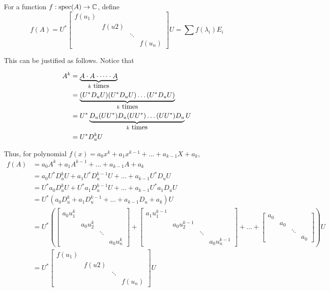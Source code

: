 For a function $f:\operatorname{spec}(A) \to \mathbb{C}$, define
\[f(A) = U^*\begin{bmatrix}
        f(u_1)                     \\
         & f(u2)                   \\
         &       & \ddots          \\
         &       &        & f(u_n)
    \end{bmatrix}U = \sum f(\lambda_i) E_i\]

This can be justified as follows. Notice that

\begin{align*}A^k
     & = \underbrace{A\cdot A\cdot \dots \cdot A}_{k\hbox{ times}}          \\
     & = \underbrace{(U^*D_uU)(U^*D_uU)\dots(U^*D_uU)}_{k\hbox{ times}}     \\
     & = U^*\underbrace{D_u(UU^*)D_u(UU^*)\dots(UU^*)D_u}_{k\hbox{ times}}U \\
     & = U^*D_u^kU
\end{align*}

Thus, for polynomial $f(x) = a_0x^k + a_1x^{k-1} + \dots + a_{k - 1}X + a_k$,
\begin{align*}f(A)
     & = a_0A^k + a_1A^{k-1} + \dots + a_{k - 1}A + a_k                                                                \\
     & = a_0U^*D_u^kU + a_1U^*D_u^{k-1}U + \dots + a_{k-1}U^*D_uU                                                      \\
     & = U^*a_0D_u^kU + U^*a_1D_u^{k-1}U + \dots + a_{k-1}U^*a_1D_uU                                                   \\
     & = U^*\left(a_0D_u^k + a_1D_u^{k-1} + \dots + a_{k - 1}D_u + a_k\right)U                                         \\
     & = U^*\left(\begin{bmatrix}a_0u_1^k\\&a_0u_2^k\\&&\ddots\\&&&a_0u_n^k\end{bmatrix} + \begin{bmatrix}a_1u_1^{k-1}\\&a_0u_2^{k-1}\\&&\ddots\\&&&a_0u_n^{k-1}\end{bmatrix} + \dots + \begin{bmatrix}a_0\\&a_0\\&&\ddots\\&&&a_0\end{bmatrix}\right)U \\
     & = U^*\begin{bmatrix}
        f(u_1)                     \\
         & f(u2)                   \\
         &       & \ddots          \\
         &       &        & f(u_n)
    \end{bmatrix}U
\end{align*}

